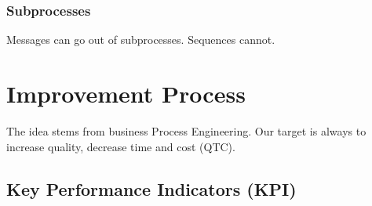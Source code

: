 \documentclass{article}
\begin{document}
            \subsubsection{Subprocesses}
                Messages can go out of subprocesses. Sequences cannot.
    \section{Improvement Process}
        The idea stems from business Process Engineering. Our target is always to increase quality, decrease time and cost (QTC).
        
        \subsection{Key Performance Indicators (KPI)}
            \subsubsection{}
\end{document}
